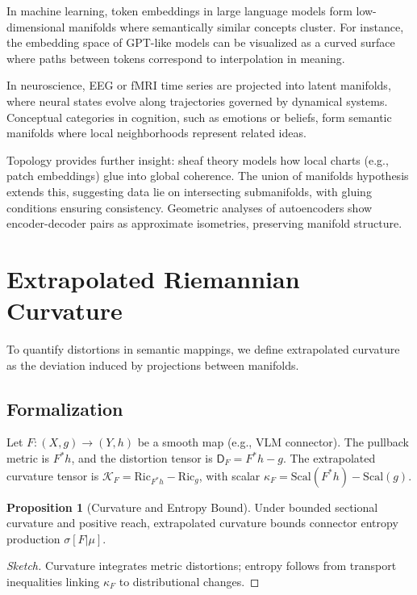 \documentclass{article}
\theoremstyle{definition}
\newtheorem{proposition}[theorem]{Proposition}
\begin{document}
In machine learning, token embeddings in large language models form low-dimensional manifolds where semantically similar concepts cluster. For instance, the embedding space of GPT-like models can be visualized as a curved surface where paths between tokens correspond to interpolation in meaning.

In neuroscience, EEG or fMRI time series are projected into latent manifolds, where neural states evolve along trajectories governed by dynamical systems. Conceptual categories in cognition, such as emotions or beliefs, form semantic manifolds where local neighborhoods represent related ideas.

Topology provides further insight: sheaf theory models how local charts (e.g., patch embeddings) glue into global coherence. The union of manifolds hypothesis \cite{brown2023union} extends this, suggesting data lie on intersecting submanifolds, with gluing conditions ensuring consistency. Geometric analyses of autoencoders \cite{lee2023geometric} show encoder-decoder pairs as approximate isometries, preserving manifold structure.

\section{Extrapolated Riemannian Curvature}

To quantify distortions in semantic mappings, we define extrapolated curvature as the deviation induced by projections between manifolds.

\subsection{Formalization}

Let $F: (X, g) \to (Y, h)$ be a smooth map (e.g., VLM connector). The pullback metric is $F^* h$, and the distortion tensor is $\mathsf{D}_F = F^* h - g$. The extrapolated curvature tensor is $\mathcal{K}_F = \mathrm{Ric}_{F^* h} - \mathrm{Ric}_g$, with scalar $\kappa_F = \mathrm{Scal}(F^* h) - \mathrm{Scal}(g)$.

\begin{proposition}[Curvature and Entropy Bound]
Under bounded sectional curvature and positive reach, extrapolated curvature bounds connector entropy production $\sigma[F|\mu]$.
\end{proposition}

\begin{proof}[Sketch]
Curvature integrates metric distortions; entropy follows from transport inequalities linking $\kappa_F$ to distributional changes.
\end{proof}
\end{document}
